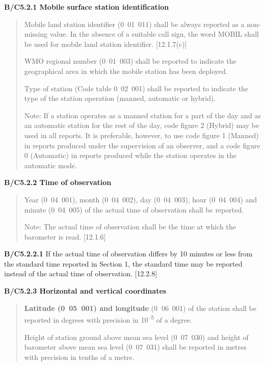\textbf{B/C5.2.1 Mobile surface station identification}

\begin{quote}
Mobile land station identifier (0~01~011) shall be always reported as a non-missing value. In the absence of a suitable call sign, the word MOBIL shall be used for mobile land station identifier. {[}12.1.7(c){]}

WMO regional number (0~01~003) shall be reported to indicate the geographical area in which the mobile station has been deployed.

Type of station (Code table 0~02~001) shall be reported to indicate the type of the station operation (manned, automatic or hybrid).

Note: If a station operates as a manned station for a part of the day and as an automatic station for the rest of the day, code figure 2 (Hybrid) may be used in all reports. It is preferable, however, to use code figure 1 (Manned) in reports produced under the supervision of an observer, and a code figure 0 (Automatic) in reports produced while the station operates in the automatic mode.
\end{quote}

\textbf{B/C5.2.2 Time of observation}

\begin{quote}
Year (0~04~001), month (0~04~002), day (0~04~003), hour (0~04~004) and minute (0~04~005) of the actual time of observation shall be reported.

Note: The actual time of observation shall be the time at which the barometer is read. {[}12.1.6{]}
\end{quote}

\textbf{B/C5.2.2.1} If the actual time of observation differs by 10 minutes or less from the standard time reported in Section 1, the standard time may be reported instead of the actual time of observation. {[}12.2.8{]}

\textbf{B/C5.2.3 Horizontal and vertical coordinates}

\begin{quote}
\textbf{Latitude (0~05~001) and longitude} (0\textbf{~}06~001) of the station shall be reported in degrees with precision in 10\textsuperscript{--5} of a degree.

Height of station ground above mean sea level (0~07~030) and height of barometer above mean sea level (0~07~031) shall be reported in metres with precision in tenths of a metre.
\end{quote}

